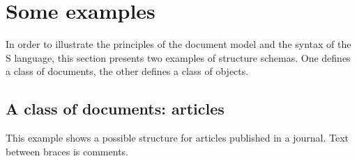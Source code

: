 \section{Some examples}

In order to illustrate the principles of the document model and the
syntax of the S language, this section presents two examples of
structure schemas.  One defines a class of documents, the other
defines a class of objects.

\subsection{A class of documents: articles}

This example shows a possible structure for articles published in a
journal.  Text between braces is comments.

